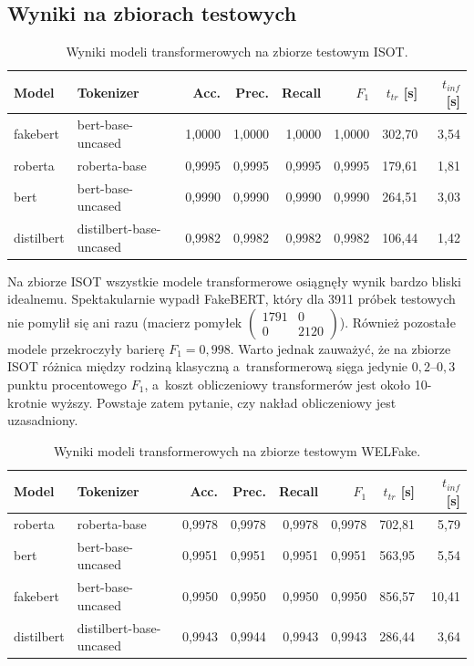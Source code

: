 \subsection{Wyniki na zbiorach testowych}
\label{sec:wyniki_bert_test}

\begin{table}[ht]
\centering
\caption{Wyniki modeli transformerowych na zbiorze testowym ISOT.}
\label{tab:bert_isot}
\begin{tabular}{llrrrrrr}
\toprule
Model & Tokenizer & Acc. & Prec. & Recall & $F_1$ & $t_{tr}$ [s] & $t_{inf}$ [s] \\
\midrule
fakebert   & bert-base-uncased       & 1,0000 & 1,0000 & 1,0000 & 1,0000 & 302,70 & 3,54 \\
roberta    & roberta-base            & 0,9995 & 0,9995 & 0,9995 & 0,9995 & 179,61 & 1,81 \\
bert       & bert-base-uncased       & 0,9990 & 0,9990 & 0,9990 & 0,9990 & 264,51 & 3,03 \\
distilbert & distilbert-base-uncased & 0,9982 & 0,9982 & 0,9982 & 0,9982 & 106,44 & 1,42 \\
\bottomrule
\end{tabular}
\end{table}

Na zbiorze ISOT wszystkie modele transformerowe osiągnęły wynik bardzo
bliski idealnemu. Spektakularnie wypadł FakeBERT, który dla 3911
próbek testowych nie pomylił się ani razu (macierz pomyłek
$\begin{pmatrix}1791 & 0\\0 & 2120\end{pmatrix}$). Również pozostałe
modele przekroczyły barierę \(F_1 = 0{,}998\). Warto jednak zauważyć,
że na zbiorze ISOT różnica między rodziną klasyczną a~transformerową
sięga jedynie \(0{,}2\)--\(0{,}3\) punktu procentowego $F_1$, a~koszt
obliczeniowy transformerów jest około 10-krotnie wyższy. Powstaje
zatem pytanie, czy nakład obliczeniowy jest uzasadniony.

\begin{table}[ht]
\centering
\caption{Wyniki modeli transformerowych na zbiorze testowym WELFake.}
\label{tab:bert_welfake}
\begin{tabular}{llrrrrrr}
\toprule
Model & Tokenizer & Acc. & Prec. & Recall & $F_1$ & $t_{tr}$ [s] & $t_{inf}$ [s] \\
\midrule
roberta    & roberta-base            & 0,9978 & 0,9978 & 0,9978 & 0,9978 & 702,81 & 5,79  \\
bert       & bert-base-uncased       & 0,9951 & 0,9951 & 0,9951 & 0,9951 & 563,95 & 5,54  \\
fakebert   & bert-base-uncased       & 0,9950 & 0,9950 & 0,9950 & 0,9950 & 856,57 & 10,41 \\
distilbert & distilbert-base-uncased & 0,9943 & 0,9944 & 0,9943 & 0,9943 & 286,44 & 3,64  \\
\bottomrule
\end{tabular}
\end{table}

